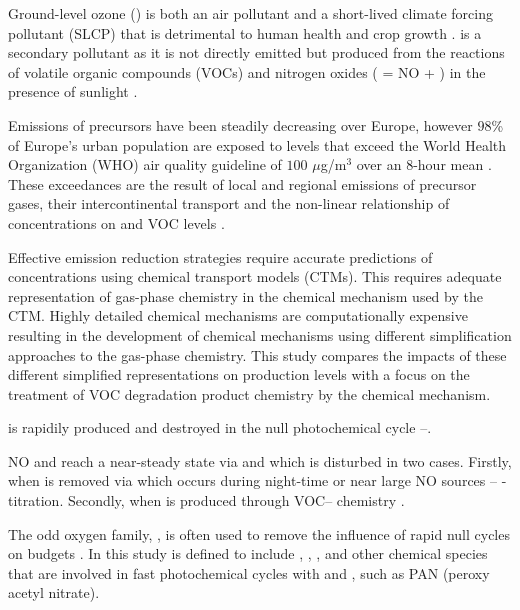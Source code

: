 Ground-level ozone () is both an air pollutant and a short-lived climate forcing pollutant (SLCP) that is detrimental to human health and crop growth \citep{AQEU:2013}. 
 is a secondary pollutant as it is not directly emitted but produced from the reactions of volatile organic compounds (VOCs) and nitrogen oxides ( = NO + ) in the presence of sunlight \citep{Atkinson:2000}.

Emissions of  precursors have been steadily decreasing over Europe, however $98$\% of Europe's urban population are exposed to levels that exceed the World Health Organization (WHO) air quality guideline of $100$ $\mu$g/m$^3$ over an $8$-hour mean \citep{WHO:2006}. 
These exceedances are the result of local and regional emissions of  precursor gases, their intercontinental transport and the non-linear relationship of  concentrations on  and VOC levels \citep{AQEU:2013}.

Effective emission reduction strategies require accurate predictions of  concentrations using chemical transport models (CTMs). 
This requires adequate representation of gas-phase chemistry in the chemical mechanism used by the CTM. 
Highly detailed chemical mechanisms are computationally expensive resulting in the development of chemical mechanisms using different simplification approaches to the gas-phase chemistry.
This study compares the impacts of these different simplified representations on  production levels with a focus on the treatment of VOC degradation product chemistry by the chemical mechanism.

 is rapidily produced and destroyed in the null photochemical cycle --. 
\begin{reactionlist}
\end{reactionlist}
NO and  reach a near-steady state via  and  which is disturbed in two cases. 
Firstly, when  is removed via  which occurs during night-time or near large NO sources -- -titration. 
Secondly, when  is produced through VOC-- chemistry \citep{Sillman:1999}.

The odd oxygen family, , is often used to remove the influence of rapid null cycles on  budgets \citep{Seinfeld:2006}. 
In this study  is defined to include , , ,  and other chemical species that are involved in fast photochemical cycles with  and , such as PAN (peroxy acetyl nitrate).

